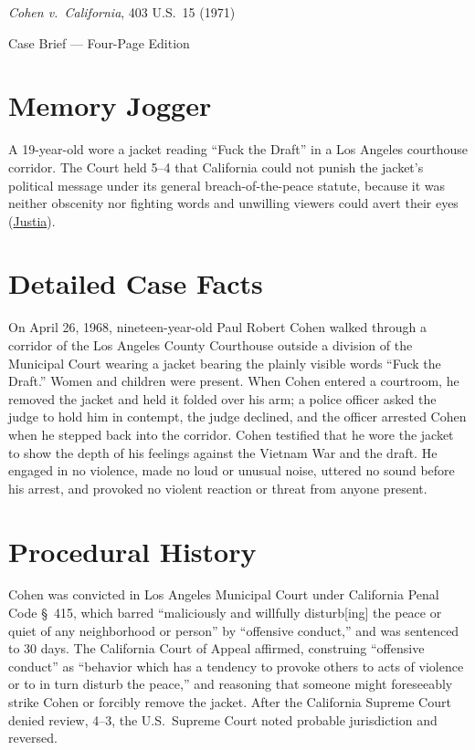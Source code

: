 \documentclass[12pt]{article}
\begin{document}
\begin{center}
{\LARGE \textit{Cohen v.\ California}, 403 U.S.\ 15 (1971)\par}
\vspace{0.8em}
{\large Case Brief --- Four-Page Edition\par}
\end{center}
\vspace{1em}

\section{Memory Jogger}

A 19-year-old wore a jacket reading ``Fuck the Draft'' in a Los Angeles courthouse corridor. The Court held 5--4 that California could not punish the jacket's political message under its general breach-of-the-peace statute, because it was neither obscenity nor fighting words and unwilling viewers could avert their eyes (\href{https://supreme.justia.com/cases/federal/us/403/15/}{Justia}).

\section{Detailed Case Facts}

On April 26, 1968, nineteen-year-old Paul Robert Cohen walked through a corridor of the Los Angeles County Courthouse outside a division of the Municipal Court wearing a jacket bearing the plainly visible words ``Fuck the Draft.'' Women and children were present. When Cohen entered a courtroom, he removed the jacket and held it folded over his arm; a police officer asked the judge to hold him in contempt, the judge declined, and the officer arrested Cohen when he stepped back into the corridor. Cohen testified that he wore the jacket to show the depth of his feelings against the Vietnam War and the draft. He engaged in no violence, made no loud or unusual noise, uttered no sound before his arrest, and provoked no violent reaction or threat from anyone present.

\section{Procedural History}

Cohen was convicted in Los Angeles Municipal Court under California Penal Code \S~415, which barred ``maliciously and willfully disturb[ing] the peace or quiet of any neighborhood or person'' by ``offensive conduct,'' and was sentenced to 30 days. The California Court of Appeal affirmed, construing ``offensive conduct'' as ``behavior which has a tendency to provoke others to acts of violence or to in turn disturb the peace,'' and reasoning that someone might foreseeably strike Cohen or forcibly remove the jacket. After the California Supreme Court denied review, 4--3, the U.S.\ Supreme Court noted probable jurisdiction and reversed.
\end{document}
